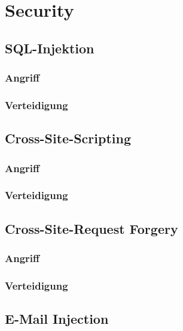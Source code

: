 \chapter{Security}
\label{cha:security}



\section{SQL-Injektion}
\blindtext

\subsection*{Angriff}
\blindtext

\subsection*{Verteidigung}
\blindtext


\section{Cross-Site-Scripting}
\blindtext

\subsection*{Angriff}
\blindtext

\subsection*{Verteidigung}
\blindtext


\section{Cross-Site-Request Forgery}
\blindtext

\subsection*{Angriff}
\blindtext

\subsection*{Verteidigung}
\blindtext


\section{E-Mail Injection}
\blindtext

